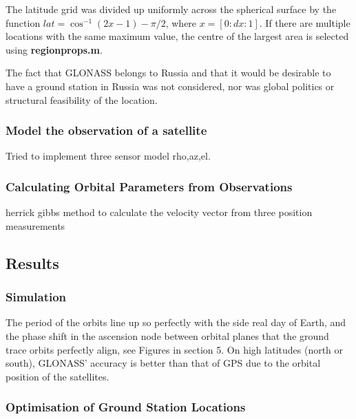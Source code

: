 \documentclass[Space3_Assign2]{subfile}
\begin{document}
The latitude grid was divided up uniformly across the spherical surface by the function $lat = \cos^{-1}(2x-1)-\pi/2$, where $x = [0:dx:1]$. If there are multiple locations with the same maximum value, the centre of the largest area is selected using \textbf{regionprops.m}.

The fact that GLONASS belongs to Russia and that it would be desirable to have a ground station in Russia was not considered, nor was global politics or structural feasibility of the location. 

\subsubsection{Model the observation of a satellite}
Tried to implement three sensor model rho,az,el.

\subsubsection{Calculating Orbital Parameters from Observations}
herrick gibbs method to calculate the velocity vector from three position measurements



\subsection{Results}
\subsubsection{Simulation}
The period of the orbits line up so perfectly with the side real day of Earth, and the phase shift in the ascension node between orbital planes that the ground trace orbits perfectly align, see Figures in section 5. On high latitudes (north or south), GLONASS' accuracy is better than that of GPS due to the orbital position of the satellites.


\subsubsection{Optimisation of Ground Station Locations}
\end{document}

